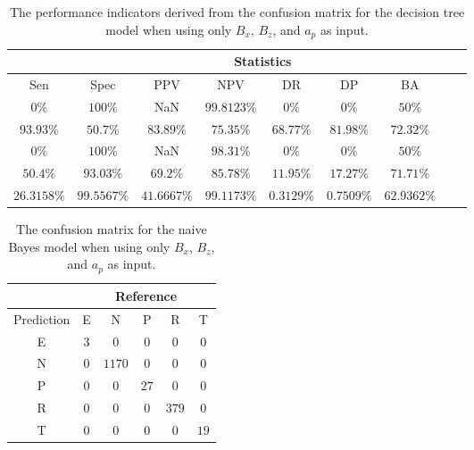 \begin{table}[!ht]
	\centering
	\begin{tabular}{|c|c|c|c|c|c|c|c|c|}
		\hline
		 & \multicolumn{7}{c|}{Statistics} \\ \hline
		Sen & Spec & PPV & NPV & DR & DP & BA \\ \hline
		$0\%$ & $100\%$ & NaN & $99.8123\%$ & $0\%$ & $0\%$ & $50\%$ \\ \hline
		$93.93\%$ & $50.7\%$ & $83.89\%$ & $75.35\%$ & $68.77\%$ & $81.98\%$ & $72.32\%$ \\ \hline
		$0\%$ & $100\%$ & NaN & $98.31\%$ & $0\%$ & $0\%$ & $50\%$ \\ \hline
		$50.4\%$ & $93.03\%$ & $69.2\%$ & $85.78\%$ & $11.95\%$ & $17.27\%$ & $71.71\%$ \\ \hline
		$26.3158\%$ & $99.5567\%$ & $41.6667\%$ & $99.1173\%$ & $0.3129\%$ & $0.7509\%$ & $62.9362\%$ \\ \hline
	\end{tabular}
	\caption{The performance indicators derived from the confusion matrix for the decision tree model when using only $B_{x}$, $B_{z}$, and $a_{p}$ as input.}
	\label{tab:cs:xzap:C5.0}
\end{table}

\begin{table}[!ht]
	\centering
	\begin{tabular}{|c|c|c|c|c|c|}
		\hline
		 & \multicolumn{5}{|c|}{Reference} \\ \hline
		 Prediction & E & N & P & R & T \\ \hline
		 E & $3$ & $0$ & $0$ & $0$ & $0$ \\ \hline
		 N & $0$ & $1170$ & $0$ & $0$ & $0$ \\ \hline
		 P & $0$ & $0$ & $27$ & $0$ & $0$ \\ \hline
		 R & $0$ & $0$ & $0$ & $379$ & $0$ \\ \hline
		 T & $0$ & $0$ & $0$ & $0$ & $19$ \\ \hline
	\end{tabular}
	\caption{The confusion matrix for the naive Bayes model when using only $B_{x}$, $B_{z}$, and $a_{p}$ as input.}
	\label{tab:cm:xzap:nb}
\end{table}

